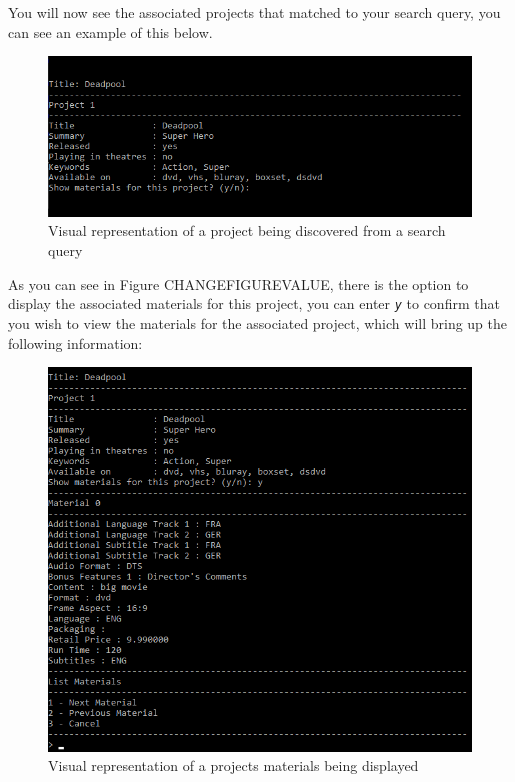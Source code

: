 \documentclass[
  english,
  a4paper,
,tablecaptionabove
]{scrartcl}
\begin{document}
You will now see the associated projects that matched to your search
query, you can see an example of this below.

\begin{figure}
\centering
\includegraphics{images/user-guide/view-mode/project-search-term.png}
\caption{Visual representation of a project being discovered from a
search query}
\end{figure}

As you can see in Figure CHANGEFIGUREVALUE, there is the option to
display the associated materials for this project, you can enter
\emph{\texttt{y}} to confirm that you wish to view the materials for the
associated project, which will bring up the following information:

\begin{figure}
\centering
\includegraphics{images/user-guide/view-mode/project-search-materials-accept.png}
\caption{Visual representation of a projects materials being displayed}
\end{figure}
\end{document}
